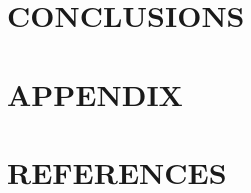 \documentclass[twocolumn,prl,nobalancelastpage,aps,10pt]{revtex4-1}
\begin{document}

\section{CONCLUSIONS}


\section{APPENDIX}

%

\section{REFERENCES}



\end{document}
